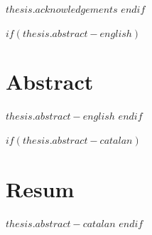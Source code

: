 \vspace*{\baselineskip}

\normalsize{$thesis.acknowledgements$}
\newpage
\afterpage{\blankpage}
$endif$


$if(thesis.abstract-english)$
\chapter{\sffamily Abstract}

\vspace*{\baselineskip}

\normalsize{$thesis.abstract-english$}
\vspace*{\baselineskip}
$endif$


$if(thesis.abstract-catalan)$
\chapter{\sffamily Resum}

\vspace*{\baselineskip}

\normalsize{$thesis.abstract-catalan$}
\vspace*{\baselineskip}
\newpage
\afterpage{\blankpage}
$endif$


